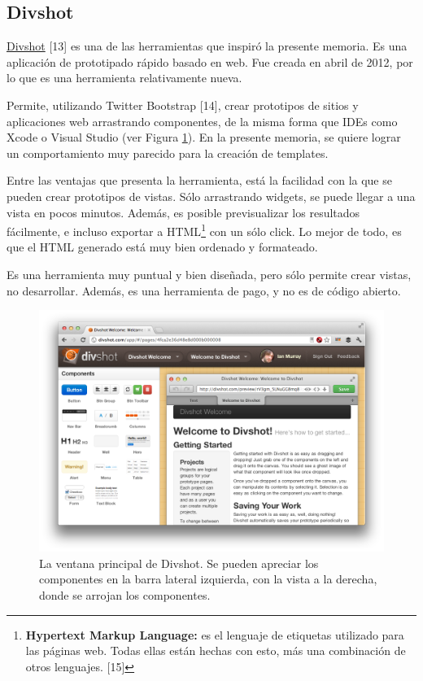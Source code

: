 \documentclass[12pt,spanish,letter]{report}
\makeatletter
\def\maxwidth{\ifdim\Gin@nat@width>\linewidth\linewidth
\else\Gin@nat@width\fi}
\let\Oldincludegraphics\includegraphics
\renewcommand{\includegraphics}[1]{\Oldincludegraphics[width=\maxwidth]{#1}}
\makeatother
\begin{document}
\subsection{Divshot}

\href{http://divshot.com/}{Divshot} {[}13{]} es una de las herramientas
que inspiró la presente memoria. Es una aplicación de prototipado rápido
basado en web. Fue creada en abril de 2012, por lo que es una
herramienta relativamente nueva.

Permite, utilizando Twitter Bootstrap {[}14{]}, crear prototipos de
sitios y aplicaciones web arrastrando componentes, de la misma forma que
IDEs como Xcode o Visual Studio (ver Figura \ref{figures:divshot}). En
la presente memoria, se quiere lograr un comportamiento muy parecido
para la creación de templates.

Entre las ventajas que presenta la herramienta, está la facilidad con la
que se pueden crear prototipos de vistas. Sólo arrastrando widgets, se
puede llegar a una vista en pocos minutos. Además, es posible
previsualizar los resultados fácilmente, e incluso exportar a
HTML\footnote{\textbf{Hypertext Markup Language:} es el lenguaje de
  etiquetas utilizado para las páginas web. Todas ellas están hechas con
  esto, más una combinación de otros lenguajes. {[}15{]}} con un sólo
click. Lo mejor de todo, es que el HTML generado está muy bien ordenado
y formateado.

Es una herramienta muy puntual y bien diseñada, pero sólo permite crear
vistas, no desarrollar. Además, es una herramienta de pago, y no es de
código abierto.

\begin{figure}[htbp]
\centering
\includegraphics{figures/divshot-big.png}
\caption{La ventana principal de Divshot. Se pueden apreciar los
componentes en la barra lateral izquierda, con la vista a la derecha,
donde se arrojan los componentes. \label{figures:divshot}}
\end{figure}
\end{document}
